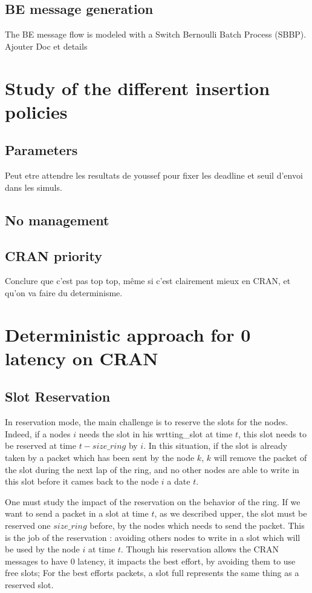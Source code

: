 \documentclass[a4paper,10pt]{article}
\begin{document}
    \subsection{BE message generation}
    	The BE message flow is modeled with a Switch Bernoulli Batch Process (SBBP). Ajouter Doc et details
    
\section{Study of the different insertion policies}

  \subsection{Parameters}
  Peut etre attendre les resultats de youssef pour fixer les deadline et seuil d'envoi dans les simuls.
  \subsection{No management}
  \subsection{CRAN priority}
  Conclure que c'est pas top top, même si c'est clairement mieux en CRAN, et qu'on va faire du determinisme.

\section{Deterministic approach for 0 latency on CRAN}
\label{det}
\subsection{Slot Reservation}
In reservation mode, the main challenge is to reserve the slots for the nodes. Indeed, if a nodes $i$ needs the slot in his wrtting\_slot at time $t$, this slot needs to be reserved at time $t - size\_ring$ by $i$. In this situation, if the slot is already taken by a packet which has been sent by the node $k$, $k$ will remove the packet of the slot during the next lap of the ring, and no other nodes are able to write in this slot before it cames back to the node $i$ a date $t$.

One must study the impact of the reservation on the behavior of the ring. If we want to send a packet in a slot at time $t$, as we described upper, the slot must be reserved one $size\_ring$ before, by the nodes which needs to send the packet. This is the job of the reservation : avoiding others nodes to write in a slot which will be used by the node $i$ at time $t$. Though his reservation allows the CRAN messages to have 0 latency, it impacts the best effort, by avoiding them to use free slots; For the best efforts packets, a slot full represents the same thing as a reserved slot.
\end{document}
